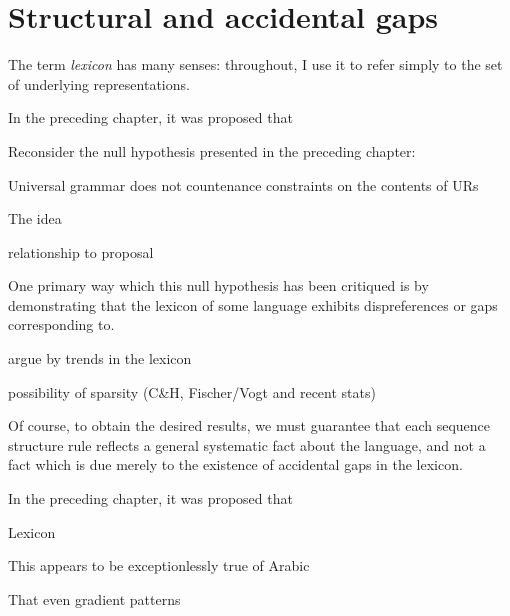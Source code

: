 \chapter{Structural and accidental gaps\protect{}}
\label{clusters}

The term \emph{lexicon} has many senses: throughout, I use it to refer simply to the set of underlying representations.

In the preceding chapter, it was proposed that 

Reconsider the null hypothesis presented in the preceding chapter:

\begin{example}
Universal grammar does not countenance constraints on the contents of URs
\end{example}

The idea 

relationship to proposal

One primary way which this null hypothesis has been critiqued is by demonstrating that the lexicon of some language 
exhibits dispreferences or gaps corresponding to.

argue by trends in the lexicon

possibility of sparsity (C\&H, Fischer/Vogt and recent stats)

Of course, to obtain the desired results, we must guarantee that each sequence structure rule reflects a general systematic fact about the language, and not a fact which is due merely to the existence of accidental gaps in the lexicon. \citep[][401, fn.~8]{Stanley1967}

In the preceding chapter, it was proposed that 

Lexicon

This appears to be exceptionlessly true of Arabic

That even gradient patterns 

